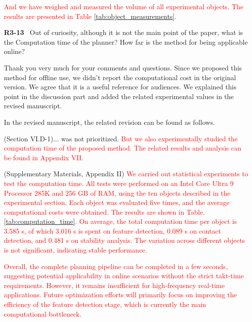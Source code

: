 \documentclass[journal]{IEEEtran}
\newcommand{\rev}[1]{\textcolor{red}{#1}}
\begin{document}
\rev{And we have weighed and measured the volume of all experimental objects. The results are presented in Table \ref{tab:object_measurements}.}






\bigskip

\noindent
{\textbf{\color{black}R3-13}\color{gray}~
Out of curiosity, although it is not the main point of the paper, what is the Computation time of the planner? How far is the method for being applicable online?
}

Thank you very much for your comments and questions. Since we proposed this method for offline use, we didn't report the computational cost in the original version. We agree that it is a useful reference for audiences. We explained this point in the discussion part and added the related experimental values in the revised manuscript.

In the revised manuscript, the related revision can be found as follows.

(Section VI.D-1)...
was not prioritized. \rev{But we also experimentally studied the computation time of the proposed method. The related results and analysis can be found in Appendix VII.}

(Supplementary Materials, Appendix II)
\rev{We carried out statistical experiments to test the computation time. All tests were performed on an Intel Core Ultra 9 Processor 285K and 256 GB of RAM, using the ten objects described in the experimental section. Each object was evaluated five times, and the average computational costs were obtained. The results are shown in Table. \ref{tab:computation_time}. On average, the total computation time per object is 3.585 s, of which 3.016 s is spent on feature detection, 0.089 s on contact detection, and 0.481 s on stability analysis. The variation across different objects is not significant, indicating stable performance.}

\rev{Overall, the complete planning pipeline can be completed in a few seconds, suggesting potential applicability in online scenarios without the strict takt-time requirements. However, it remains insufficient for high-frequency real-time applications.
Future optimization efforts will primarily focus on improving the efficiency of the feature detection stage, which is currently the main computational bottleneck.}

\end{document}
